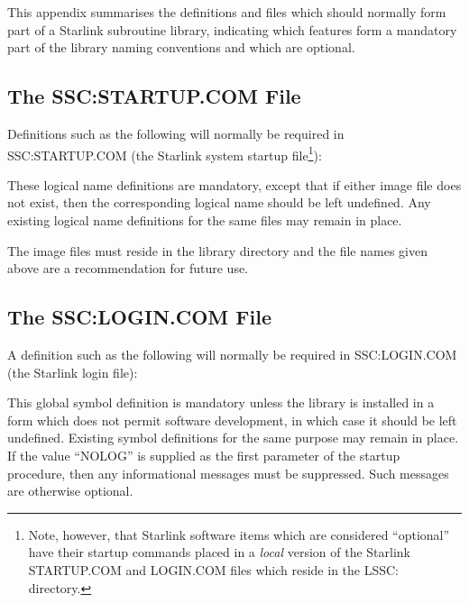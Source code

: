 \documentclass[noabs,11pt,nolof]{starlink}
\begin{document}
This appendix summarises the definitions and files which should normally
form part of a Starlink subroutine library, indicating which features form a
mandatory part of the library naming conventions and which are optional.

\subsection{The SSC:STARTUP.COM File}

Definitions such as the following will normally be required in
SSC:STARTUP.COM (the Starlink system startup
file\footnote{Note, however, that Starlink software items which are
considered ``optional'' have their startup commands placed in a \emph{local\/} version of the Starlink STARTUP.COM and LOGIN.COM files which
reside in the LSSC: directory.}):


These logical name definitions are mandatory, except that if either image
file does not exist, then the corresponding logical name should be left
undefined.
Any existing logical name definitions for the same files may remain in place.

The image files must reside in the library directory and the file names
given above are a recommendation for future use.

\subsection{The SSC:LOGIN.COM File}

A definition such as the following will normally be required in
SSC:LOGIN.COM (the Starlink login file\footnotemark[\thefootnote]):


This global symbol definition is mandatory unless the library is installed
in a form which does not permit software development, in which case it
should be left undefined.
Existing symbol definitions for the same purpose may remain in place.
If the value ``NOLOG'' is supplied as the first parameter of the startup
procedure, then any informational messages must be suppressed.
Such messages are otherwise optional.
\end{document}
